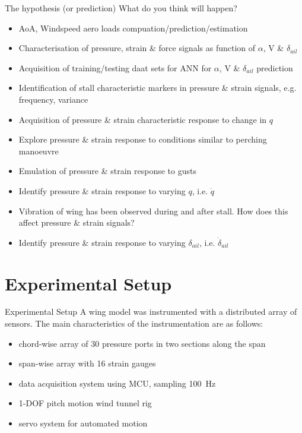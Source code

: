 \documentclass[aspectratio=169]{beamer}            %
\begin{document}
\begin{frame}{The hypothesis (or prediction)}
  What do you think will happen?
	\begin{itemize}
		\item AoA, Windspeed aero loads compuation/prediction/estimation
		\item Characterisation of pressure, strain \& force signals as function of ${\alpha}$, V
			\& ${\delta_{ail}}$
		\item Acquisition of training/testing daat sets for ANN for ${\alpha}$, V \&
			${\delta_{ail}}$ prediction
		\item Identification of stall characteristic markers in pressure \& strain signals, e.g.
			frequency, variance
		\item Acquisition of pressure \& strain characteristic response to change in ${q}$
		\item Explore pressure \& strain response to conditions similar to perching manoeuvre\
		\item Emulation of pressure \& strain response to gusts
		\item Identify pressure \& strain response to varying ${q}$, i.e. ${\dot{q}}$
		\item Vibration of wing has been observed during and after stall. How does this affect
			pressure \& strain signals?
		\item Identify pressure \& strain response to varying ${\delta_{ail}}$, i.e.
						${\dot{\delta}_{ail}}$
	\end{itemize}
\end{frame}

\section{Experimental Setup}
\begin{frame}{Experimental Setup}
  A wing model was instrumented with a distributed array of sensors. The main characteristics of the instrumentation are as follows:
	\begin{itemize}
		\item{chord-wise array of 30 pressure ports in two sections along the span}
		\item{span-wise array with 16 strain gauges}
		\item{data acquisition system using MCU, sampling \@ \SI{100}{\hertz}}
		\item{1-DOF pitch motion wind tunnel rig}
		\item{servo system for automated motion}
	\end{itemize}
\end{frame}
\end{document}
